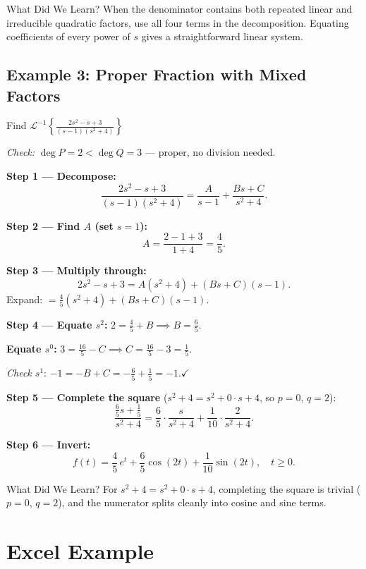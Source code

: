 \documentclass[12pt,a4paper]{article}
\begin{document}
\begin{learnbox}{What Did We Learn?}
When the denominator contains both repeated linear and irreducible quadratic
factors, use all four terms in the decomposition. Equating coefficients of
every power of $s$ gives a straightforward linear system.
\end{learnbox}

\subsection{Example 3: Proper Fraction with Mixed Factors}
\begin{infobox}{Find $\mathcal{L}^{-1}\!\left\{\frac{2s^2-s+3}{(s-1)(s^2+4)}\right\}$}

\textit{Check:} $\deg P = 2 < \deg Q = 3$ --- proper, no division needed.

\textbf{Step 1 --- Decompose:}
\[
  \frac{2s^2-s+3}{(s-1)(s^2+4)} = \frac{A}{s-1}+\frac{Bs+C}{s^2+4}.
\]

\textbf{Step 2 --- Find $A$ (set $s=1$):}
\[
  A = \frac{2-1+3}{1+4} = \frac{4}{5}.
\]

\textbf{Step 3 --- Multiply through:}
\[
  2s^2-s+3 = A(s^2+4)+(Bs+C)(s-1).
\]
Expand: $= \frac{4}{5}(s^2+4)+(Bs+C)(s-1)$.

\textbf{Step 4 --- Equate $s^2$:} $2 = \tfrac{4}{5}+B \implies B=\tfrac{6}{5}$.

\textbf{Equate $s^0$:} $3 = \tfrac{16}{5}-C \implies C=\tfrac{16}{5}-3=\tfrac{1}{5}$.

\textit{Check $s^1$}: $-1 = -B+C = -\tfrac{6}{5}+\tfrac{1}{5}=-1.\checkmark$

\textbf{Step 5 --- Complete the square} ($s^2+4 = s^2+0\cdot s+4$, so $p=0$, $q=2$):
\[
  \frac{\tfrac{6}{5}s+\tfrac{1}{5}}{s^2+4}
  = \frac{6}{5}\cdot\frac{s}{s^2+4}+\frac{1}{10}\cdot\frac{2}{s^2+4}.
\]

\textbf{Step 6 --- Invert:}
\[
  f(t) = \frac{4}{5}\,e^{t}+\frac{6}{5}\cos(2t)+\frac{1}{10}\sin(2t),\quad t\geq 0.
\]
\end{infobox}

\begin{learnbox}{What Did We Learn?}
For $s^2+4 = s^2+0\cdot s+4$, completing the square is trivial ($p=0$,
$q=2$), and the numerator splits cleanly into cosine and sine terms.
\end{learnbox}

\section{Excel Example }
\end{document}
